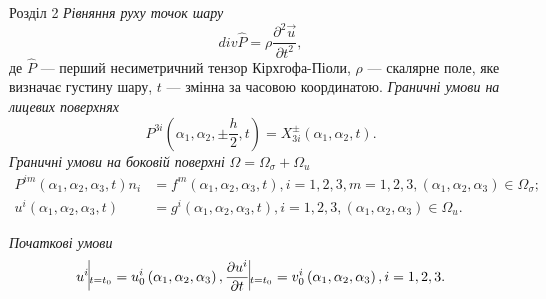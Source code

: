 \documentclass[8pt]{beamer}
\numberwithin{figure}{section}
\numberwithin{equation}{section}
\numberwithin{table}{section}
\begin{document}
\begin{frame}{Розділ 2}
\emph{Рівняння руху точок шару}
\begin{equation} \label{eq:P}
div \hat{P} = \rho \frac{\partial^2 \vec{u}}{\partial t^2},
\end{equation}
де $\hat{P}$ --- перший несиметричний тензор Кірхгофа-Піоли, $\rho$ --- скалярне поле, яке визначає густину шару, $t$ --- змінна за часовою координатою.
\linebreak 
\linebreak 
\emph{Граничні умови на лицевих поверхнях}
\begin{equation}
P^{3i}\left( \alpha_1, \alpha_2, \pm \frac{h}{2}, t \right) = X^{\pm}_{3i}\left( \alpha_1, \alpha_2, t \right).
\end{equation}
\linebreak
\emph{Граничні умови на боковій поверхні} $\Omega = \Omega_{\sigma} + \Omega_{u} $
\begin{align}
P^{im}\left( \alpha_1, \alpha_2, \alpha_3, t \right)n_i &= f^{m}\left( \alpha_1, \alpha_2, \alpha_3, t \right), i=1,2,3, m=1,2,3, \left( \alpha_1, \alpha_2,\alpha_3\right)\in\Omega_{\sigma};\\
u^{i}\left( \alpha_1, \alpha_2, \alpha_3, t \right) &=g^{i}\left( \alpha_1, \alpha_2, \alpha_3, t \right), i=1,2,3, \left( \alpha_1, \alpha_2,\alpha_3\right)\in\Omega_{u}.
\end{align}

\emph{Початкові умови}
\begin{equation}
u^{i}\vline _{t=t_0} = u^i_0 \left( \alpha_1, \alpha_2, \alpha_3 \right), \frac{\partial u^{i}}{\partial t}\vline _{t=t_0} =v^i_0 \left( \alpha_1, \alpha_2, \alpha_3 \right), i=1,2,3.
\end{equation}

\end{frame}
\end{document}
